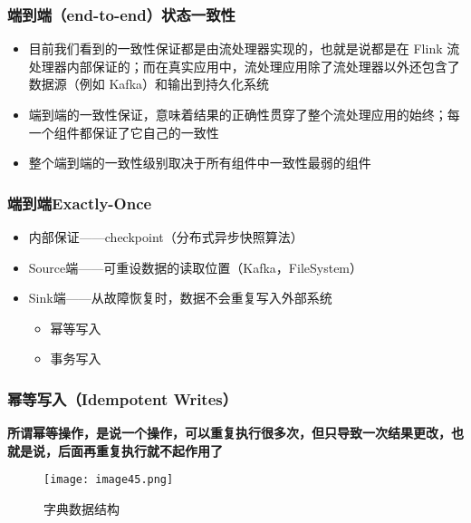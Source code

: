 \documentclass{beamer}
\begin{document}
  \begin{frame}
      \frametitle{端到端（end-to-end）状态一致性}
  
      \begin{itemize}
          \item 目前我们看到的一致性保证都是由流处理器实现的，也就是说都是在 Flink 流处理器内部保证的；而在真实应用中，流处理应用除了流处理器以外还包含了数据源（例如 Kafka）和输出到持久化系统
          \item 端到端的一致性保证，意味着结果的正确性贯穿了整个流处理应用的始终；每一个组件都保证了它自己的一致性
          \item 整个端到端的一致性级别取决于所有组件中一致性最弱的组件
      \end{itemize}
  
  \end{frame}

  \begin{frame}
      \frametitle{端到端Exactly-Once}
  
      \begin{itemize}
          \item 内部保证——checkpoint（分布式异步快照算法）
          \item Source端——可重设数据的读取位置（Kafka，FileSystem）
          \item Sink端——从故障恢复时，数据不会重复写入外部系统
          \begin{itemize}
              \item 幂等写入
              \item 事务写入
          \end{itemize}
      \end{itemize}
  
  \end{frame}

  \begin{frame}
      \frametitle{幂等写入（Idempotent Writes）}
  
      \textbf{所谓幂等操作，是说一个操作，可以重复执行很多次，但只导致一次结果更改，也就是说，后面再重复执行就不起作用了}
      
       \begin{figure}
      	\centering
      	\texttt{[image: image45.png]}
      	\caption{字典数据结构}
      \end{figure}
  
  \end{frame}
\end{document}
